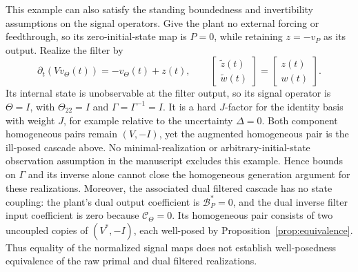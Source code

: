 \documentclass[11pt,a4paper]{article}
\begin{document}
This example can also satisfy the standing boundedness and
invertibility assumptions on the signal operators. Give the plant no
external forcing or feedthrough, so its zero-initial-state map is
$P=0$, while retaining $z=-v_P$ as its output. Realize the filter by
\[
 \partial_t(Vv_\Theta(t))=-v_\Theta(t)+z(t),\qquad
 \begin{bmatrix}\tilde z(t)\\\tilde w(t)\end{bmatrix}
 =\begin{bmatrix}z(t)\\w(t)\end{bmatrix}.
\]
Its internal state is unobservable at the filter output, so its signal
operator is $\Theta=I$, with $\Theta_{22}=I$ and
$\Gamma=\Gamma^{-1}=I$. It is a hard $J$-factor for the identity basis
with weight $J$, for example relative to the uncertainty $\Delta=0$.
Both component homogeneous pairs remain $(V,-I)$, yet the augmented
homogeneous pair is the ill-posed cascade above. No minimal-realization
or arbitrary-initial-state observation assumption in the manuscript
excludes this example. Hence bounds on $\Gamma$ and its inverse alone
cannot close the homogeneous generation argument for these realizations.
Moreover, the associated dual filtered cascade has no state coupling:
the plant's dual output coefficient is $\mathcal B_P^*=0$, and the
dual inverse filter input coefficient is zero because
$\mathcal C_\Theta=0$. Its homogeneous pair consists of two uncoupled
copies of $(V^*,-I)$, each well-posed by
Proposition~\ref{prop:equivalence}. Thus equality of the normalized
signal maps does not establish well-posedness equivalence of the raw
primal and dual filtered realizations.
\end{document}
